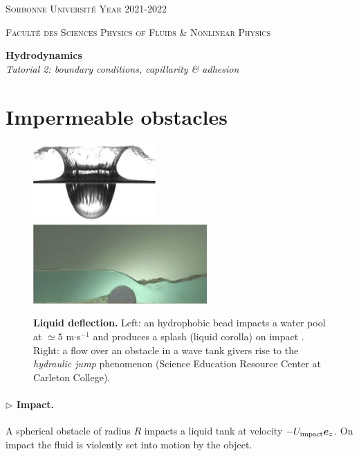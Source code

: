 \documentclass[11pt,a4paper]{article}
\newcommand{\be}{\matrixsym e}
\newcommand{\prg}[1]{\paragraph{$\rhd$ #1}}
\begin{document}
\setlength{\unitlength}{1cm}
\noindent
\parbox{\textwidth}{
\textsc{
Sorbonne Université  
\hfill
Year 2021-2022
}
}
\parbox{\textwidth}{
\textsc{
Faculté des Sciences
\hfill
Physics of Fluids \& Nonlinear Physics
}
}

\begin{center}
\Large
\textbf{Hydrodynamics} \\ 
\textsl{Tutorial 2: boundary conditions, capillarity \& adhesion} \\[1ex]
\end{center}

\section{Impermeable obstacles}
\togglefalse{corrige}

\begin{figure}[ht]
    \centering
    \includegraphics[height=3cm,valign=m]{splash.jpg}
    \hspace{1cm}
    \includegraphics[height=3cm,valign=m]{flow_over_weir.jpg}
    \caption[Caption for LOF]{\textbf{Liquid deflection.} Left: an hydrophobic bead impacts a water pool at $\simeq 5$ m$\cdot$s$^{-1}$ and produces a splash (liquid corolla) on impact \citep{Eggers2007}. Right: a flow over an obstacle in a wave tank givers rise to the \textit{hydraulic jump} phenomenon (Science Education Resource Center at Carleton College\setcounter{footnote}{0}\footnotemark).}
    \label{fig:obstacle}
\end{figure}
\prg{Impact.}
A spherical obstacle of radius $R$ impacts a liquid tank at velocity $-U_\text{impact} \be_{z}$. On impact the fluid is violently set into motion by the object.
\end{document}
